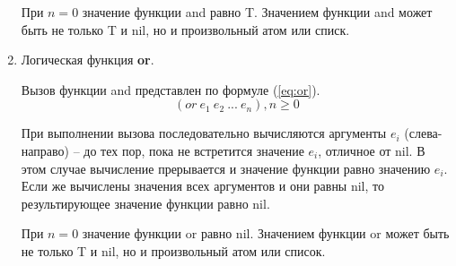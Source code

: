 \begin{enumerate}
При $n=0$ значение функции and равно T. Значением функции and может быть не только T и nil, но и произвольный атом или списк.

\item Логическая функция \textbf{or}.

Вызов функции and представлен по формуле (\ref{eq:or}).
\begin{equation}
	\label{eq:or}
	(or\ e_1\ e_2\ ...\ e_n), n \geq 0
\end{equation}

При выполнении вызова последовательно вычисляются аргументы $e_i$
(слева-направо) -- до тех пор, пока не встретится значение $e_i$, отличное от nil. В этом случае вычисление прерывается и значение функции равно значению $e_i$. Если же вычислены значения всех аргументов и они равны nil, то результирующее значение функции
равно nil.

При $n=0$ значение функции or равно nil. Значением функции or может быть не только T и nil, но и произвольный атом или список.

\end{enumerate}
